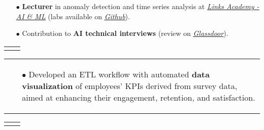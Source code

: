 \documentclass[11pt,a4paper,sans,english]{moderncv}
\makeatletter
\renewcommand*{\cventry}[6][.25em]{%
	\vspace{1.5mm}%
	\begin{tabular*}{\textwidth}{@{\extracolsep{\fill}}ll}%
		\ifthenelse{\equal{#3}{}}{}{\textbf{#3}} &
		\ifthenelse{\equal{#2}{}}{}{#4 #6 #2}\\%
	\end{tabular*}%
	\par\addvspace{#1}}
\newcommand*{\mycvitem}[2][.25em]{%
	\vspace{-.25em}
	\begin{tabular}{@{}p{\textwidth}@{}}%
		\small#2%
	\end{tabular}%
	\par\addvspace{-0.7em}  %
}
\newcommand*{\cvtag}[1]{%
	\textcolor{lightgray!50!black}{\fbox{\mathstrut\scriptsize\textsf{\textbf{#1}}}}%
}
\makeatother
\begin{document}
{\begin{itemize}
			\item[$\bullet$] \textbf{Lecturer} in anomaly detection  and time series analysis at \href{https://academy.linksmt.it/corso-di-formazione-post-laurea-artificial-intelligence-machine-learning/}{\textit{\underline{Links Academy - AI \& ML}}} (labs available on	 \href{https://github.com/francesco-s/Links-Academy---Anomaly-Detection-Time-series-analysis}{\textit{\underline{Github}}}).
			\item[$\bullet$] Contribution to \textbf{AI technical interviews} (review on \href{https://www.glassdoor.it/Colloquio/Links-Management-and-Technology-Colloquio-RVW82686296.htm}{\textit{\underline{Glassdoor}}}).
	\end{itemize}}
 \vspace*{.25cm}
\cventry{\textcolor{gray}{\scalebox{0.8}\faCalendar} 10/2022--02/2023}{Artificial Intelligence and Data - Analyst}{\textcolor{gray}{\scalebox{0.8}\faBuilding} \href{https://www2.deloitte.com}{\textit{Deloitte}} }{}{\textcolor{gray}{\scalebox{0.8}\faMapMarker} Bari }{}
\mycvitem{
\vspace*{-.6cm}
\begin{flushleft}
	\noindent
	\cvtag{Qlik Sense} \cvtag{SQL} \cvtag{MS Excel} \cvtag{Qlik NPrinting}
\end{flushleft}
\vspace*{-.2cm}
\begin{itemize}
	\item[$\bullet$] Developed an ETL workflow with automated \textbf{data visualization} of employees' KPIs derived from survey data, aimed at enhancing their engagement, retention, and satisfaction.
\end{itemize}}
\vspace*{.25cm}
\cventry{\textcolor{gray}{\scalebox{0.8}\faCalendar} 12/2021--05/2022}{AI engineer and System Administrator - Intern}{\textcolor{gray}{\scalebox{0.8}\faBuilding} \href{https://www.intesasanpaolo.com/}{\textit{Intesa Sanpaolo}} }{}{\textcolor{gray}{\scalebox{0.8}\faMapMarker} Torino }{}
\end{document}
